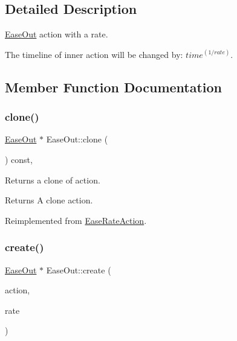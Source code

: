 \subsection{Detailed Description}
\hyperlink{classEaseOut}{Ease\+Out} action with a rate. 

The timeline of inner action will be changed by\+: ${ time }^ { (1/rate) }$. 

\subsection{Member Function Documentation}
\mbox{\label{classEaseOut_aaa3ddcdc100a3378279054d596e87178}} 
\subsubsection{\texorpdfstring{clone()}{clone()}}
{\footnotesize\ttfamily \hyperlink{classEaseOut}{Ease\+Out} $\ast$ Ease\+Out\+::clone (\begin{DoxyParamCaption}\item[{void}]{ }\end{DoxyParamCaption}) const\hspace{0.3cm}{\ttfamily [override]}, {\ttfamily [virtual]}}

Returns a clone of action.

\begin{DoxyReturn}{Returns}
A clone action. 
\end{DoxyReturn}


Reimplemented from \hyperlink{classEaseRateAction_a50323a94f7587203d7b02bb66fe2e67e}{Ease\+Rate\+Action}.

\mbox{\label{classEaseOut_a8c52d1cc96774a86e93fc20b3b311cf5}} 
\subsubsection{\texorpdfstring{create()}{create()}}
{\footnotesize\ttfamily \hyperlink{classEaseOut}{Ease\+Out} $\ast$ Ease\+Out\+::create (\begin{DoxyParamCaption}\item[{\hyperlink{classActionInterval}{Action\+Interval} $\ast$}]{action,  }\item[{float}]{rate }\end{DoxyParamCaption})\hspace{0.3cm}{\ttfamily [static]}}



